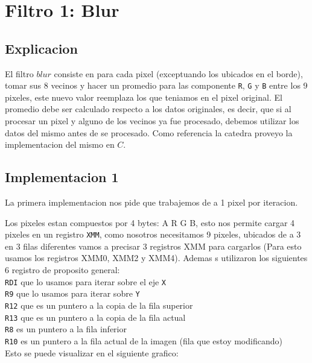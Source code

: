 \section{Filtro 1: Blur}

\subsection{Explicacion}

El filtro $blur$ consiste en para cada pixel (exceptuando los ubicados en el borde), tomar sus 8 vecinos y hacer un promedio para las componente \texttt{R}, \texttt{G} y \texttt{B} entre los 9 pixeles, este nuevo valor reemplaza los que teniamos en el pixel original. El promedio debe ser calculado respecto a los datos originales, es decir, que si al procesar un pixel y alguno de los vecinos ya fue procesado, debemos utilizar los datos del mismo antes de se procesado. Como referencia la catedra proveyo la implementacion del mismo en $C$.

\subsection{Implementacion 1}
La primera implementacion nos pide que trabajemos de a 1 pixel por iteracion.

Los pixeles estan compuestos por 4 bytes: A R G B, esto nos permite cargar 4 pixeles en un registro \texttt{XMM}, como nosotros necesitamos 9 pixeles, ubicados de a 3 en 3 filas diferentes vamos a precisar 3 registros XMM para cargarlos (Para esto usamos los registros XMM0, XMM2 y XMM4). Ademas s utilizaron los siguientes 6 registro de proposito general: \\

\noindent
\texttt{RDI} que lo usamos para iterar sobre el eje \texttt{X} \\
\texttt{R9} que lo usamos para iterar sobre \texttt{Y} \\
\texttt{R12} que es un puntero a la copia de la fila superior \\
\texttt{R13} que es un puntero a la copia de la fila actual \\
\texttt{R8} es un puntero a la fila inferior\\
\texttt{R10} es un puntero a la fila actual de la imagen (fila que estoy modificando) \\

Esto se puede visualizar en el siguiente grafico:

